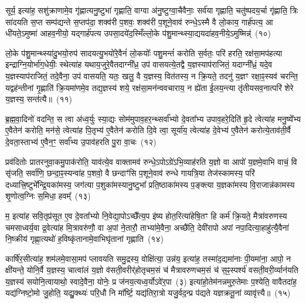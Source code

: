 सूर्य॒ इत्या॑ह॒ सशु॑क्राणामे॒व गृ॑ह्णात्यनु॒ष्टुभा॑ गृह्णाति॒ वाग्वा अ॑नु॒ष्टुग्वा॒चैवैनाः॒ सर्व॑या गृह्णाति॒ चतु॑ष्पदय॒र्चा गृ॑ह्णाति॒ त्रिः सा॑दयति स॒प्त सम्प॑द्यन्ते स॒प्तप॑दा॒ शक्व॑री प॒शवः॒ शक्व॑री प॒शूने॒वाव॑ रुन्धे॒\-ऽस्मै वै लो॒काय॒ गार्\mbox{}ह॑पत्य॒ आ धी॑यते॒\-ऽमुष्मा॑ आहव॒नीयो॒ यद्गार्\mbox{}ह॑पत्य उपसा॒दये॑द॒स्मिँल्लो॒के प॑शु॒मान्थ्स्या॒द्ययदा॑हव॒नीये॒\-ऽमुष्मिन्न्॑~(१०)

लो॒के प॑शु॒मान्थ्स्या॑दु॒भयो॒रुप॑ सादयत्यु॒भयो॑रे॒वैनं॑ लो॒कयोः᳚ पशु॒मन्तं॑ करोति स॒र्वतः॒ परि॑ हरति॒ रक्ष॑सा॒मप॑हत्या इन्द्राग्नि॒योर्भा॑ग॒धेयीः॒ स्थेत्या॑ह यथाय॒जुरे॒वैतदाग्नी᳚ध्र॒ उप॑ वासयत्ये॒तद्वै य॒ज्ञस्याप॑राजितं॒ यदाग्नी᳚ध्रं॒ यदे॒व य॒ज्ञस्याप॑राजितं॒ तदे॒वैना॒ उप॑ वासयति॒ यतः॒ खलु॒ वै य॒ज्ञस्य॒ वित॑तस्य॒ न क्रि॒यते॒ तदनु॑ य॒ज्ञꣳ रक्षा॒ꣴ॒स्यव॑ चरन्ति॒ यद्वह॑न्तीनां गृ॒ह्णाति॑ क्रि॒यमा॑णमे॒व तद्य॒ज्ञस्य॑ शये॒ रक्ष॑सा॒मन॑न्ववचाराय॒ न ह्ये॑ता ई॒लय॒न्त्या तृ॑तीयसव॒नात्परि॑ शेरे य॒ज्ञस्य॒ सन्त॑त्यै॥~(११)

{\anuvakamend[{स्या॒दिन्द्रो॑ गृह्णी॒याद॑स्त्व॒मुष्मि॑न्क्रि॒यते॒ षड्विꣳ॑शतिश्च}]}%

ब्र॒ह्म॒वा॒दिनो॑ वदन्ति॒ स त्वा अ॑ध्व॒र्युः स्या॒द्यः सोम॑मुपाव॒हर॒न्थ्सर्वा᳚भ्यो दे॒वता᳚भ्य उपाव॒हरे॒दिति॑ हृ॒दे त्वेत्या॑ह मनु॒ष्ये᳚भ्य ए॒वैतेन॑ करोति॒ मन॑से॒ त्वेत्या॑ह पि॒तृभ्य॑ ए॒वैतेन॑ करोति दि॒वे त्वा॒ सूर्या॑य॒ त्वेत्या॑ह दे॒वेभ्य॑ ए॒वैतेन॑ करोत्ये॒ताव॑ती॒र्वै दे॒वता॒स्ताभ्य॑ ए॒वैन॒ꣳ॒ सर्वा᳚भ्य उ॒पाव॑हरति पु॒रा वा॒चः~(१२)

प्रव॑दितोः प्रातरनुवा॒कमु॒पाक॑रोति॒ याव॑त्ये॒व वाक्तामव॑ रुन्धे॒\-ऽपो\-ऽग्रे॑\-ऽभि॒व्याह॑रति य॒ज्ञो वा आपो॑ य॒ज्ञमे॒वाभि वाचं॒ वि सृ॑जति॒ सर्वा॑णि॒ छन्दा॒ꣴ॒स्यन्वा॑ह प॒शवो॒ वै छन्दाꣳ॑सि प॒शूने॒वाव॑ रुन्धे गायत्रि॒या तेज॑स्कामस्य॒ परि॑ दध्यात्त्रि॒ष्टुभे᳚न्द्रि॒यका॑मस्य॒ जग॑त्या प॒शुका॑मस्यानु॒ष्टुभा᳚ प्रति॒ष्ठाका॑मस्य प॒ङ्क्त्या य॒ज्ञका॑मस्य वि॒राजान्न॑कामस्य शृ॒णोत्व॒ग्निः स॒मिधा॒ हवम्᳚~(१३)

म॒ इत्या॑ह सवि॒तृप्र॑सूत ए॒व दे॒वता᳚भ्यो नि॒वेद्या॒पो\-ऽच्छै᳚त्य॒प इ॑ष्य होत॒रित्या॑हेषि॒तꣳ हि कर्म॑ क्रि॒यते॒ मैत्रा॑वरुणस्य चमसाध्वर्य॒वा द्र॒वेत्या॑ह मि॒त्रावरु॑णौ॒ वा अ॒पां ने॒तारौ॒ ताभ्या॑मे॒वैना॒ अच्छै॑ति॒ देवी॑रापो अपां नपा॒दित्या॒हाहु॑त्यै॒वैना॑ नि॒ष्क्रीय॑ गृह्णा॒त्यथो॑ ह॒विष्कृ॑तानामे॒वाभिघृ॑तानां गृह्णाति~(१४)

कार्\mbox{}षि॑र॒सीत्या॑ह॒ शम॑लमे॒वासा॒मप॑ प्लावयति समु॒द्रस्य॒ वोक्षि॑त्या॒ उन्न॑य॒ इत्या॑ह॒ तस्मा॑द॒द्यमा॑नाः पी॒यमा॑ना॒ आपो॒ न क्षी॑यन्ते॒ योनि॒र्वै य॒ज्ञस्य॒ चात्वा॑लं य॒ज्ञो व॑सती॒वरीर्॑\mbox{}होतृचम॒सं च॑ मैत्रावरुणचम॒सं च॑ स॒ꣴ॒स्पर्श्य॑ वसती॒वरी॒र्व्यान॑यति य॒ज्ञस्य॑ सयोनि॒त्वायाथो॒ स्वादे॒वैना॒ योनेः॒ प्र ज॑नय॒त्यध्व॒र्यो\-ऽवे॑र॒पा~(३) इत्या॑हो॒तेम॑नन्नमुरु॒तेमाः प॒श्येति॒ वावैतदा॑ह॒ यद्य॑ग्निष्टो॒मो जु॒होति॒ यद्यु॒क्थ्यः॑ परि॒धौ नि मा᳚र्ष्टि॒ यद्य॑तिरा॒त्रो यजु॒र्वद॒न्प्र प॑द्यते यज्ञक्रतू॒नां व्यावृ॑त्त्यै॥~(१५)

